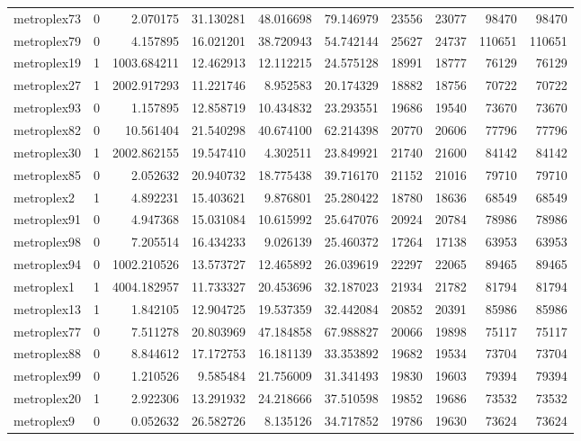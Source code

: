 \begin{longtable}{|l|r|r|r|r|r|r|r|r|r|}
metroplex73 & 0 & 2.070175 & 31.130281 & 48.016698 & 79.146979 & 23556 & 23077 & 98470 & 98470 \\
metroplex79 & 0 & 4.157895 & 16.021201 & 38.720943 & 54.742144 & 25627 & 24737 & 110651 & 110651 \\
metroplex19 & 1 & 1003.684211 & 12.462913 & 12.112215 & 24.575128 & 18991 & 18777 & 76129 & 76129 \\
metroplex27 & 1 & 2002.917293 & 11.221746 & 8.952583 & 20.174329 & 18882 & 18756 & 70722 & 70722 \\
metroplex93 & 0 & 1.157895 & 12.858719 & 10.434832 & 23.293551 & 19686 & 19540 & 73670 & 73670 \\
metroplex82 & 0 & 10.561404 & 21.540298 & 40.674100 & 62.214398 & 20770 & 20606 & 77796 & 77796 \\
metroplex30 & 1 & 2002.862155 & 19.547410 & 4.302511 & 23.849921 & 21740 & 21600 & 84142 & 84142 \\
metroplex85 & 0 & 2.052632 & 20.940732 & 18.775438 & 39.716170 & 21152 & 21016 & 79710 & 79710 \\
metroplex2 & 1 & 4.892231 & 15.403621 & 9.876801 & 25.280422 & 18780 & 18636 & 68549 & 68549 \\
metroplex91 & 0 & 4.947368 & 15.031084 & 10.615992 & 25.647076 & 20924 & 20784 & 78986 & 78986 \\
metroplex98 & 0 & 7.205514 & 16.434233 & 9.026139 & 25.460372 & 17264 & 17138 & 63953 & 63953 \\
metroplex94 & 0 & 1002.210526 & 13.573727 & 12.465892 & 26.039619 & 22297 & 22065 & 89465 & 89465 \\
metroplex1 & 1 & 4004.182957 & 11.733327 & 20.453696 & 32.187023 & 21934 & 21782 & 81794 & 81794 \\
metroplex13 & 1 & 1.842105 & 12.904725 & 19.537359 & 32.442084 & 20852 & 20391 & 85986 & 85986 \\
metroplex77 & 0 & 7.511278 & 20.803969 & 47.184858 & 67.988827 & 20066 & 19898 & 75117 & 75117 \\
metroplex88 & 0 & 8.844612 & 17.172753 & 16.181139 & 33.353892 & 19682 & 19534 & 73704 & 73704 \\
metroplex99 & 0 & 1.210526 & 9.585484 & 21.756009 & 31.341493 & 19830 & 19603 & 79394 & 79394 \\
metroplex20 & 1 & 2.922306 & 13.291932 & 24.218666 & 37.510598 & 19852 & 19686 & 73532 & 73532 \\
metroplex9 & 0 & 0.052632 & 26.582726 & 8.135126 & 34.717852 & 19786 & 19630 & 73624 & 73624 \\

\end{longtable}
